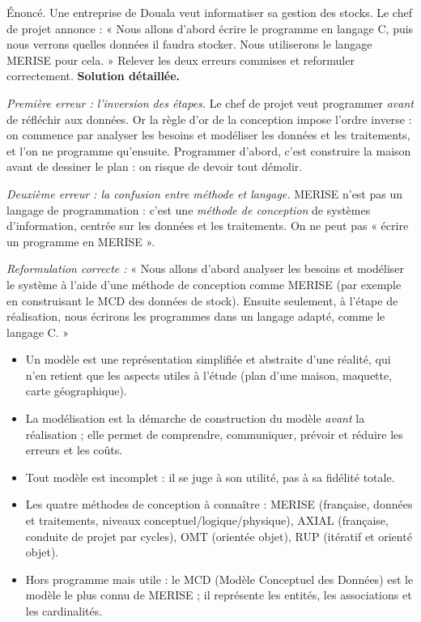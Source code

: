 \documentclass[11pt]{article}
\newcommand{\cle}[1]{{\popxbold\color{popdark}#1}}
\begin{document}
\begin{exoresolu}
Énoncé. Une entreprise de Douala veut informatiser sa gestion des stocks. Le chef de projet annonce : « Nous allons d'abord écrire le programme en langage C, puis nous verrons quelles données il faudra stocker. Nous utiliserons le langage MERISE pour cela. » Relever les deux erreurs commises et reformuler correctement.
\tcblower
\textbf{Solution détaillée.}

\emph{Première erreur : l'inversion des étapes.} Le chef de projet veut programmer \emph{avant} de réfléchir aux données. Or la règle d'or de la conception impose l'ordre inverse : on commence par analyser les besoins et modéliser les données et les traitements, et l'on ne programme qu'ensuite. Programmer d'abord, c'est construire la maison avant de dessiner le plan : on risque de devoir tout démolir.

\emph{Deuxième erreur : la confusion entre méthode et langage.} MERISE n'est pas un langage de programmation : c'est une \emph{méthode de conception} de systèmes d'information, centrée sur les données et les traitements. On ne peut pas « écrire un programme en MERISE ».

\emph{Reformulation correcte :} « Nous allons d'abord analyser les besoins et modéliser le système à l'aide d'une méthode de conception comme MERISE (par exemple en construisant le MCD des données de stock). Ensuite seulement, à l'étape de réalisation, nous écrirons les programmes dans un langage adapté, comme le langage C. »
\end{exoresolu}

\begin{aretenir}
\begin{itemize}
\item Un \cle{modèle} est une représentation simplifiée et abstraite d'une réalité, qui n'en retient que les aspects utiles à l'étude (plan d'une maison, maquette, carte géographique).
\item La \cle{modélisation} est la démarche de construction du modèle \emph{avant} la réalisation ; elle permet de comprendre, communiquer, prévoir et réduire les erreurs et les coûts.
\item Tout modèle est incomplet : il se juge à son utilité, pas à sa fidélité totale.
\item Les quatre méthodes de conception à connaître : \cle{MERISE} (française, données et traitements, niveaux conceptuel/logique/physique), \cle{AXIAL} (française, conduite de projet par cycles), \cle{OMT} (orientée objet), \cle{RUP} (itératif et orienté objet).
\item Hors programme mais utile : le \cle{MCD} (Modèle Conceptuel des Données) est le modèle le plus connu de MERISE ; il représente les entités, les associations et les cardinalités.
\end{itemize}
\end{aretenir}
\end{document}
